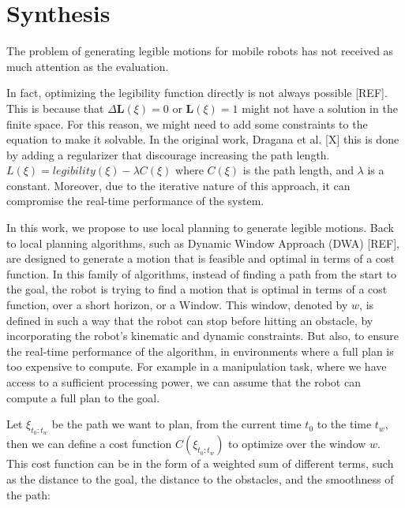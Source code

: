 
\section{Synthesis}

The problem of generating legible motions for mobile robots has not received as much attention as the evaluation.


In fact, optimizing the legibility function directly is not always possible [REF].
This is because that $\Delta \mathbf{L}(\xi) = 0$ or $\mathbf{L}(\xi) = 1$ might not have a solution in the finite space.
For this reason, we might need to add some constraints to the equation to make it solvable.
In the original work, Dragana et al. [X] this is done by adding a regularizer that discourage increasing the path length.
$L(\xi) = legibility(\xi) - \lambda C(\xi)$
where $C(\xi)$ is the path length, and $\lambda$ is a constant.
Moreover, due to the iterative nature of this approach, it can compromise the real-time performance of the system.


In this work, we propose to use local planning to generate legible motions.
Back to local planning algorithms, such as Dynamic Window Approach (DWA) [REF], are designed to generate a motion that is feasible and optimal in terms of a cost function.
%
In this family of algorithms, instead of finding a path from the start to the goal,
the robot is trying to find a motion that is optimal in terms of a cost function, over a short horizon, or a Window.
This window, denoted by $w$, is defined in such a way that the robot can stop before hitting an obstacle,
by incorporating the robot's kinematic and dynamic constraints.
But also, to ensure the real-time performance of the algorithm, in environments where a full plan is too expensive to compute.
For example in a manipulation task, where we have access to a sufficient processing power,
we can assume that the robot can compute a full plan to the goal.

Let $\xi_{t_0:t_w}$ be the path we want to plan, from the current time $t_0$ to the time $t_w$, then we can define a cost function $C(\xi_{t_0:t_w})$ to optimize over the window $w$.
This cost function can be in the form of a weighted sum of different terms, such as the distance to the goal, the distance to the obstacles, and the smoothness of the path:

